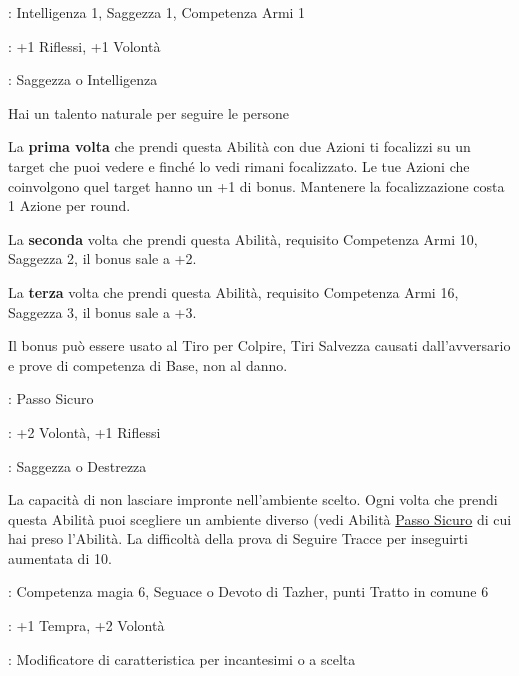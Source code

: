 \begin{multicols}{2}
\begin{description}[noitemsep, topsep=0pt, parsep=0pt, partopsep=0pt, leftmargin=0cm, labelwidth=2.5cm]
    \item[\textbf{Requisito}]: Intelligenza 1, Saggezza 1, Competenza Armi 1
    \item[\textbf{Tiri Salvezza}]: +1 Riflessi, +1 Volontà
    \item[\textbf{Caratteristica}]: Saggezza o Intelligenza
\end{description}

Hai un talento naturale per seguire le persone

La \textbf{prima volta} che prendi questa Abilità con due Azioni ti focalizzi su un target che puoi vedere e finché lo vedi rimani focalizzato. Le tue Azioni che coinvolgono quel target hanno un +1 di bonus. Mantenere la focalizzazione costa 1 Azione per round.

La \textbf{seconda} volta che prendi questa Abilità, requisito Competenza Armi 10, Saggezza 2, il bonus sale a +2.

La \textbf{terza} volta che prendi questa Abilità, requisito Competenza Armi 16, Saggezza 3, il bonus sale a +3.

Il bonus può essere usato al Tiro per Colpire, Tiri Salvezza causati dall'avversario e prove di competenza di Base, non al danno.

\begin{description}[noitemsep, topsep=0pt, parsep=0pt, partopsep=0pt, leftmargin=0cm, labelwidth=2.5cm]
    \item[\textbf{Requisito}]: Passo Sicuro
    \item[\textbf{Tiri Salvezza}]: +2 Volontà, +1 Riflessi
    \item[\textbf{Caratteristica}]: Saggezza o Destrezza
\end{description}

La capacità di non lasciare impronte nell'ambiente scelto. Ogni volta che prendi questa Abilità puoi scegliere un ambiente diverso (vedi Abilità \hyperlink{passosicuro}{Passo Sicuro} di cui hai preso l'Abilità. La difficoltà della prova di Seguire Tracce per inseguirti aumentata di 10.

\begin{description}[noitemsep, topsep=0pt, parsep=0pt, partopsep=0pt, leftmargin=0cm, labelwidth=2.5cm]
    \item[\textbf{Requisito}]: Competenza magia 6, Seguace o Devoto di Tazher, punti Tratto in comune 6
    \item[\textbf{Tiri Salvezza}]: +1 Tempra, +2 Volontà
    \item[\textbf{Caratteristica}]: Modificatore di caratteristica per incantesimi o a scelta
\end{description}


\end{multicols}
